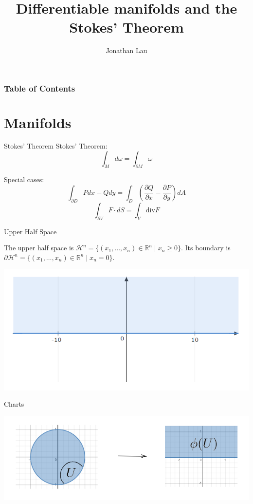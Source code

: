 \documentclass[9pt]{beamer}
\title[Differentiable manifolds and the Stokes' Theorem]
{Differentiable manifolds and the Stokes' Theorem}
\author[Jonathan Lau] %
{Jonathan Lau}
\begin{document}
	
\frame{\titlepage}

\begin{frame}
	\frametitle{Table of Contents}
	\tableofcontents
\end{frame}

\section{Manifolds}
	
\begin{frame}{Stokes' Theorem}
    Stokes' Theorem:\[\int_Md\omega = \int_{\partial M} \omega\]

    Special cases: \[\int_{\partial D} Pdx+Qdy = \int_D \left(\frac{\partial Q}{\partial x}-\frac{\partial P}{\partial y}\right) dA\]
    \[\int_{\partial V}  F\cdot dS = \int_V \text{div} F\]
\end{frame}

\begin{frame}{Upper Half Space}
    \begin{block}{}
        The upper half space is $\mathcal{H}^n=\{(x_1, \dots, x_n)\in \mathbb{R}^n\mid x_n \geq 0\}$. Its boundary is $\partial \mathcal{H}^n = \{(x_1, \dots, x_n)\in \mathbb{R}^n\mid x_n = 0\}$.
    \end{block}
    \begin{center}
        
        \includegraphics[scale=0.6]{upper_half.PNG}
    \end{center}

\end{frame}
\begin{frame}{Charts}

    \includegraphics[scale=0.8]{chart.PNG}
    
\end{frame}
\end{document}
